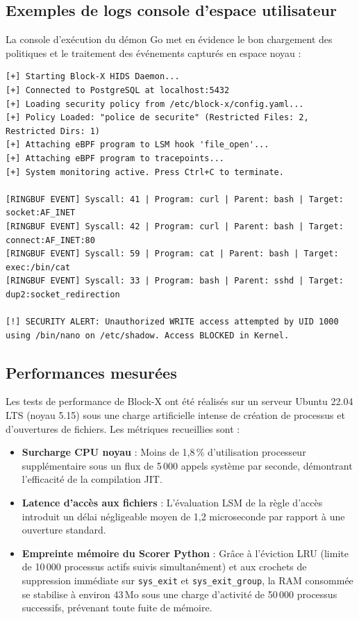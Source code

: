 \documentclass[11pt,a4paper]{article}
\begin{document}
\subsection{Exemples de logs console d'espace utilisateur}
La console d'exécution du démon Go met en évidence le bon chargement des politiques et le traitement des événements capturés en espace noyau :
\begin{lstlisting}[basicstyle=\ttfamily\scriptsize, backgroundcolor=\color{black!5}, caption=Sortie brute de la console d'administration de Block-X]
[+] Starting Block-X HIDS Daemon...
[+] Connected to PostgreSQL at localhost:5432
[+] Loading security policy from /etc/block-x/config.yaml...
[+] Policy Loaded: "police de securite" (Restricted Files: 2, Restricted Dirs: 1)
[+] Attaching eBPF program to LSM hook 'file_open'...
[+] Attaching eBPF program to tracepoints...
[+] System monitoring active. Press Ctrl+C to terminate.

[RINGBUF EVENT] Syscall: 41 | Program: curl | Parent: bash | Target: socket:AF_INET
[RINGBUF EVENT] Syscall: 42 | Program: curl | Parent: bash | Target: connect:AF_INET:80
[RINGBUF EVENT] Syscall: 59 | Program: cat | Parent: bash | Target: exec:/bin/cat
[RINGBUF EVENT] Syscall: 33 | Program: bash | Parent: sshd | Target: dup2:socket_redirection

[!] SECURITY ALERT: Unauthorized WRITE access attempted by UID 1000 using /bin/nano on /etc/shadow. Access BLOCKED in Kernel.
\end{lstlisting}

\subsection{Performances mesurées}
Les tests de performance de Block-X ont été réalisés sur un serveur Ubuntu 22.04 LTS (noyau 5.15) sous une charge artificielle intense de création de processus et d'ouvertures de fichiers. Les métriques recueillies sont :
\begin{itemize}
    \item \textbf{Surcharge CPU noyau} : Moins de 1,8\,\% d'utilisation processeur supplémentaire sous un flux de 5\,000 appels système par seconde, démontrant l'efficacité de la compilation JIT.
    \item \textbf{Latence d'accès aux fichiers} : L'évaluation LSM de la règle d'accès introduit un délai négligeable moyen de 1,2 microseconde par rapport à une ouverture standard.
    \item \textbf{Empreinte mémoire du Scorer Python} : Grâce à l'éviction LRU (limite de 10\,000 processus actifs suivis simultanément) et aux crochets de suppression immédiate sur \texttt{sys\_exit} et \texttt{sys\_exit\_group}, la RAM consommée se stabilise à environ 43\,Mo sous une charge d'activité de 50\,000 processus successifs, prévenant toute fuite de mémoire.
\end{itemize}
\end{document}

